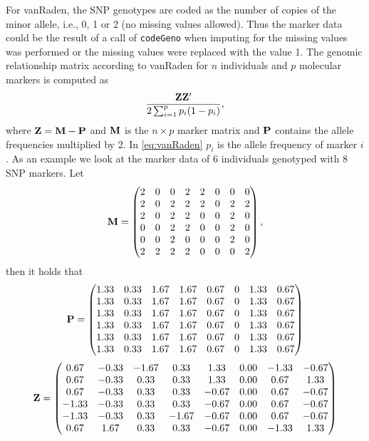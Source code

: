 \documentclass[a4paper,11pt]{article}
\begin{document}
For vanRaden, the SNP genotypes are coded as the number of copies of the minor allele, i.e., 0, 1 or 2 (no missing values allowed). Thus the marker data could be the result of a call of \texttt{codeGeno} when imputing for the missing values was performed or the missing values were replaced with the value 1.
The genomic relationship matrix according to vanRaden for $n$ individuals and $p$ molecular markers is computed as
\begin{equation}\label{eq:vanRaden}
\frac{\bf{Z}\bf{Z}'}{2\sum_{i=1}^p p_i(1-p_i)},
\end{equation}
where $\bf{Z}=\bf{M}-\bf{P}$ and $\bf{M}$ is the $n \times p$ marker matrix and $\bf{P}$ contains the allele frequencies multiplied by 2. In \eqref{eq:vanRaden} $p_i$ is the allele frequency of marker $i$.  As an example we look at the marker data of 6 individuals genotyped with 8 SNP markers. Let
$$ \bf M = \begin{pmatrix}  2 & 0 & 0 & 2 & 2 & 0 & 0 & 0 \\ 
   2 & 0 & 2 & 2 & 2 & 0 & 2 & 2 \\ 
   2 & 0 & 2 & 2 & 0 & 0 & 2 & 0 \\ 
   0 & 0 & 2 & 2 & 0 & 0 & 2 & 0 \\ 
   0 & 0 & 2 & 0 & 0 & 0 & 2 & 0 \\ 
   2 & 2 & 2 & 2 & 0 & 0 & 0 & 2 \\  
   \end{pmatrix}, $$
then it holds that
$$ \bf P = \begin{pmatrix}  1.33 & 0.33 & 1.67 & 1.67  & 0.67 & 0 &  1.33&  0.67 \\ 
   1.33 & 0.33 & 1.67 & 1.67  & 0.67 & 0 &  1.33&  0.67 \\ 
   1.33 & 0.33 & 1.67 & 1.67  & 0.67 & 0 &  1.33&  0.67 \\  
   1.33 & 0.33 & 1.67 & 1.67  & 0.67 & 0 &  1.33&  0.67 \\ 
   1.33 & 0.33 & 1.67 & 1.67  & 0.67 & 0 &  1.33&  0.67 \\  
   1.33 & 0.33 & 1.67 & 1.67  & 0.67 & 0 &  1.33&  0.67 \\   
   \end{pmatrix} $$
 $$    \bf Z = \begin{pmatrix}   0.67 & -0.33 & -1.67 & 0.33 & 1.33 & 0.00 & -1.33 & -0.67 \\ 
  0.67 & -0.33 & 0.33 & 0.33 & 1.33 & 0.00 & 0.67 & 1.33 \\ 
   0.67 & -0.33 & 0.33 & 0.33 & -0.67 & 0.00 & 0.67 & -0.67 \\ 
  -1.33 & -0.33 & 0.33 & 0.33 & -0.67 & 0.00 & 0.67 & -0.67 \\ 
   -1.33 & -0.33 & 0.33 & -1.67 & -0.67 & 0.00 & 0.67 & -0.67 \\ 
   0.67 & 1.67 & 0.33 & 0.33 & -0.67 & 0.00 & -1.33 & 1.33 \\ 
   \end{pmatrix}
  $$  
\end{document}

